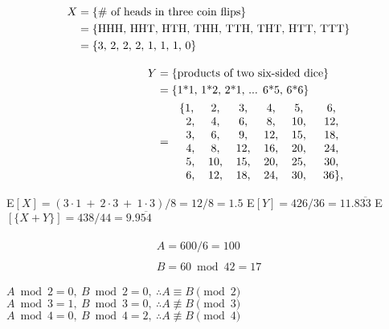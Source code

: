 \documentclass[12pt,twoside]{article}
\begin{document}
\begin{problems}
\problem  %
\begin{align}
    \begin{split}
        X &= \{\# \ \text{of heads in three coin flips}\}  \\
          &= \{\text{HHH, HHT, HTH, THH, TTH, THT, HTT, TTT}\}  \\
          &= \{\text{3, 2, 2, 2, 1, 1, 1, 0}\}  \\
    \end{split}
    \\[2ex]
    \begin{split}
        Y &= \{\text{products of two six-sided dice}\}  \\
          &= \{\text{1*1, 1*2, 2*1, ... 6*5, 6*6}\}  \\
          &=
                \begin{tabular}{ c c c c c c}
                 \{1, & 2, & 3, & 4, & 5, & 6,\\ 
               \ \  2, & 4, & 6, & 8, & 10, & 12,\\ 
              \ \   3, & 6, & 9, & 12, & 15, & 18,\\ 
             \ \    4, & 8, & 12, & 16, & 20, & 24,\\ 
           \ \      5, & 10, & 15, & 20, & 25, & 30,\\ 
          \ \       6, & 12, & 18, & 24, & 30, & \ 36\},\\ 
                \end{tabular}
    \end{split}
\end{align}
\begin{problemparts}
    \problempart E$[X] = (3\cdot1 \ + \ 2\cdot3 \ + \ 1\cdot3)/8 = 12/8 = 1.5$%
    \problempart E$[Y] = 426/36 = 11.8\overline{33}$%
    \problempart E$[\{X + Y\}] = 438/44 = 9.9\overline{54}$ %
\end{problemparts}

\problem  %
\begin{align}
    \begin{split}
        A = 600/6 = 100
    \end{split}
    \\[2ex]
    \begin{split}
        B = 60\bmod{42} = 17
    \end{split}
\end{align}

\begin{problemparts}
\problempart %
    $A\bmod{2} = 0, \ B\bmod{2} = 0, \ \therefore A \equiv B \pmod{2}$
\problempart %
    $A\bmod{3} = 1, \ B\bmod{3} = 0, \ \therefore A \not\equiv B \pmod{3}$
\problempart %
    $A\bmod{4} = 0, \ B\bmod{4} = 2, \ \therefore A \not\equiv B \pmod{4}$
\end{problemparts}


\end{problems}
\end{document}
